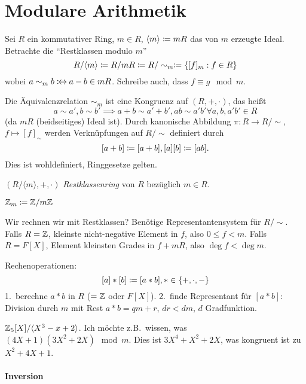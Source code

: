 \documentclass{article}
\begin{document}
\section{Modulare Arithmetik}

Sei $R$ ein kommutativer Ring, $m\in R$, $\langle m\rangle\mathrel{\mathrel{\mathop:}\mkern-1.2mu=} mR$ das von $m$ erzeugte Ideal.
Betrachte die ``Restklassen modulo $m$''
$$
R/\langle m\rangle\mathrel{\mathrel{\mathop:}\mkern-1.2mu=} R/mR\mathrel{\mathrel{\mathop:}\mkern-1.2mu=} R/\sim_m\mathrel{\mathrel{\mathop:}\mkern-1.2mu=}\{[f]_m:f\in R\}
$$
wobei $a\sim_m b \mathrel{\mathrel{\mathop:}\mkern-1.2mu\Leftrightarrow} a-b\in mR$. Schreibe auch, dass $f\equiv g \mod m$.

\begin{remark}
    Die Äquivalenzrelation $\sim_m$ ist eine Kongruenz auf $(R,+,\cdot)$, das heißt
    $$
    a\sim a', b\sim b'\implies a+b\sim a'+b', ab\sim a'b' \forall a,b,a'b'\in R
    $$
    (da $mR$ (beidseitiges) Ideal ist). Durch kanonische Abbildung $\pi:R\rightarrow R/\sim$,
    $f\mapsto[f]_\sim$ werden Verknüpfungen auf $R/\sim$ definiert durch
    $$
    [a+b]\mathrel{\mathrel{\mathop:}\mkern-1.2mu=} [a+b], [a][b]\mathrel{\mathrel{\mathop:}\mkern-1.2mu=} [ab].
    $$
    Dies ist wohldefiniert, Ringgesetze gelten.
\end{remark}

\begin{definition}
    $(R/\langle m\rangle, +, \cdot)$ \emph{Restklassenring} von $R$ bezüglich $m\in R$.
\end{definition}

\begin{notation}
    $\mathbb{Z}_m\mathrel{\mathrel{\mathop:}\mkern-1.2mu=} \mathbb{Z}/m\mathbb{Z}$
\end{notation}

Wir rechnen wir mit Restklassen? Benötige Representantensystem für $R/\sim$.
Falls $R=\mathbb{Z}$, kleinste nicht-negative Element in $f$, also $0\leq f<m$.
Falls $R=F[X]$, Element kleinsten Grades in $f+mR$, also $\deg f<\deg m$.

Rechenoperationen:
$$
[a]\ast[b]\mathrel{\mathrel{\mathop:}\mkern-1.2mu=} [a\ast b], \ast\in\{+,\cdot,-\}
$$
1.\ berechne $a\ast b$ in $R$ ($=\mathbb{Z}$ oder $F[X]$).
2.\ finde Representant für $[a\ast b]$: Division durch $m$ mit Rest $a\ast b=qm+r$, $dr<dm$, $d$
Gradfunktion.

\begin{example}
    $\mathbb{Z}_5[X]/\langle X^3-x+2\rangle$. Ich möchte z.B.~wissen, was $(4X+1)(3X^2+2X) \mod
 m$.
 Dies ist $3X^4+X^2+2X$, was kongruent ist zu $X^2+4X+1$.
\end{example}

\paragraph{Inversion}
\end{document}
